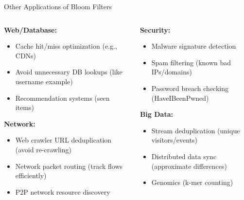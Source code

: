\begin{frame}{Other Applications of Bloom Filters}
  \vspace{0.5cm}
  \begin{columns}
    \begin{column}{0.5\textwidth}
      \textbf{Web/Database:}
      \begin{itemize}
        \item Cache hit/miss optimization (e.g., CDNs)
        \item Avoid unnecessary DB lookups (like username example)
        \item Recommendation systems (seen items)
      \end{itemize}
      \pause

      \textbf{Network:}
      \begin{itemize}
        \item Web crawler URL deduplication (avoid re-crawling)
        \item Network packet routing (track flows efficiently)
        \item P2P network resource discovery
      \end{itemize}
      \pause
    \end{column}
    \begin{column}{0.5\textwidth}
      \textbf{Security:}
      \begin{itemize}
        \item Malware signature detection
        \item Spam filtering (known bad IPs/domains)
        \item Password breach checking (HaveIBeenPwned)
      \end{itemize}
      \pause

      \textbf{Big Data:}
      \begin{itemize}
        \item Stream deduplication (unique visitors/events)
        \item Distributed data sync (approximate differences)
        \item Genomics (k-mer counting)
      \end{itemize}
      \pause
    \end{column}
  \end{columns}
\end{frame}

